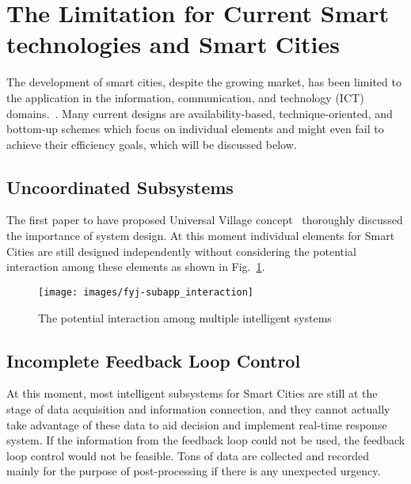 \documentclass[letterpaper, twocolumn, 10pt, conference]{IEEEtran}
\begin{document}
\section{The Limitation for Current Smart technologies and Smart Cities}
\label{sec:SmartTechLimitation}

The development of smart cities, despite the growing market, has been limited to the application in the information, communication, and technology (ICT) domains.~\cite{allam2018redefining}. Many current designs are availability-based, technique-oriented, and bottom-up schemes which focus on individual elements and might even fail to achieve their efficiency goals, which will be discussed below. 
        

 
\subsection{Uncoordinated Subsystems}
        
The first paper to have proposed Universal Village concept~\cite{mit-uv2013} thoroughly discussed the importance of system design. At this moment individual elements for Smart Cities are still designed independently without considering the potential interaction among these elements as shown in Fig.~\ref{fig:fyj:subapp_interaction}.
        
\begin{figure}[h!]
    \centering
    \texttt{[image: images/fyj-subapp\_interaction]}
    \caption{The potential interaction among multiple intelligent systems}
    \label{fig:fyj:subapp_interaction}

\end{figure}

\subsection{Incomplete Feedback Loop Control}

        
At this moment, most intelligent subsystems for Smart Cities are still at the stage of data acquisition and information connection, and they cannot actually take advantage of these data to aid decision and implement real-time response system. If the information from the feedback loop could not be used, the feedback loop control would not be feasible. Tons of data are collected and recorded mainly for the purpose of post-processing if there is any unexpected urgency. 
        
\end{document}
